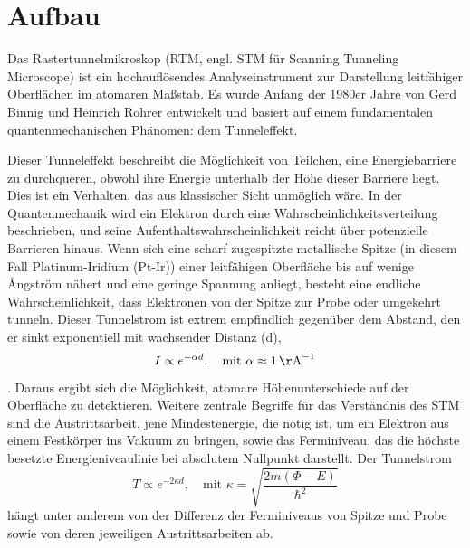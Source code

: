 \chapter{Aufbau}


Das Rastertunnelmikroskop (RTM, engl. STM für Scanning Tunneling Microscope) ist ein hochauflösendes Analyseinstrument zur Darstellung leitfähiger Oberflächen im atomaren Maßstab. Es wurde Anfang der 1980er Jahre von Gerd Binnig und Heinrich Rohrer entwickelt und basiert auf einem fundamentalen quantenmechanischen Phänomen: dem Tunneleffekt.

Dieser Tunneleffekt beschreibt die Möglichkeit von Teilchen, eine Energiebarriere zu durchqueren, obwohl ihre Energie unterhalb der Höhe dieser Barriere liegt. Dies ist ein Verhalten, das aus klassischer Sicht unmöglich wäre. In der Quantenmechanik wird ein Elektron durch eine Wahrscheinlichkeitsverteilung beschrieben, und seine Aufenthaltswahrscheinlichkeit reicht über potenzielle Barrieren hinaus. Wenn sich eine scharf zugespitzte metallische Spitze (in diesem Fall Platinum-Iridium (Pt-Ir)) einer leitfähigen Oberfläche bis auf wenige Ångström nähert und eine geringe Spannung anliegt, besteht eine endliche Wahrscheinlichkeit, dass Elektronen von der Spitze zur Probe oder umgekehrt tunneln. Dieser Tunnelstrom ist extrem empfindlich gegenüber dem Abstand, den er sinkt exponentiell mit wachsender Distanz (d), 
\begin{equation}
    I \propto e^{-\alpha d}, \quad \text{mit } \alpha \approx 1\, \mathrm{\AA}^{-1} %
\end{equation}
\cite{Tunnelstrom}. Daraus ergibt sich die Möglichkeit, atomare Höhenunterschiede auf der Oberfläche zu detektieren.
Weitere zentrale Begriffe für das Verständnis des STM sind die Austrittsarbeit, jene Mindestenergie, die nötig ist, um ein Elektron aus einem Festkörper ins Vakuum zu bringen, sowie das Ferminiveau, das die höchste besetzte Energieniveaulinie bei absolutem Nullpunkt darstellt. Der Tunnelstrom 
\begin{equation}
    T \propto e^{-2\kappa d}, \quad \text{mit } \kappa = \sqrt{\frac{2m(\Phi - E)}{\hbar^2}}
\end{equation}
\cite{Temperatur}
hängt unter anderem von der Differenz der Ferminiveaus von Spitze und Probe sowie von deren jeweiligen Austrittsarbeiten ab.


